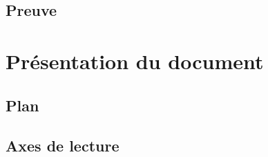 \subsection{Preuve}

\section{Présentation du document}

\subsection{Plan}

\subsection{Axes de lecture}


